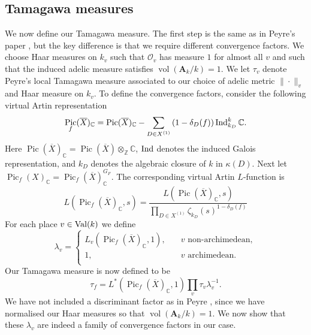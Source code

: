 \documentclass[a4paper,12pt,reqno]{amsart}
\numberwithin{equation}{section} \numberwithin{figure}{section}
\DeclareMathOperator{\Pic}{Pic} \DeclareMathOperator{\Div}{Div}
\DeclareMathOperator{\vol}{vol} \DeclareMathOperator{\spn}{span}
\renewcommand{\O}{\mathcal{O}}
\newcommand{\Adele}{\mathbf{A}}
\newcommand\ZZ{\mathbb{Z}}
\newcommand\CC{\mathbb{C}}
\renewcommand{\#}{\sharp}
\theoremstyle{definition}
\numberwithin{lemma}{section}
\begin{document}
\subsection{Tamagawa measures}
We now define our Tamagawa measure. The first step is the same as in Peyre's paper \cite[\S 2.2]{Pey95}, but the key difference is that we require different convergence factors. We choose Haar measures on $k_v$ such that $\O_v$ has measure $1$ for almost all $v$ and such that the induced adelic measure satisfies $\vol(\Adele_k/k) = 1$.
We let $\tau_v$ denote Peyre's local Tamagawa measure associated to our choice of adelic metric $\| \cdot \|_v$ and Haar measure on $k_v$. To define the convergence factors, consider the following virtual Artin representation
\begin{equation}\label{def:Pic_br}
	\Pic_f(\overline{X})_\CC=\Pic(\overline{X})_\CC
	- \sum_{D \in X^{(1)}}\left(1-\delta_D(f) \right)\Ind_{k_D}^k \CC.
\end{equation}
Here $\Pic(\overline{X})_\CC = \Pic(\overline{X}) \otimes_\ZZ \CC$, $\operatorname{Ind}$ denotes the induced
Galois representation, and $k_D$ denotes the algebraic closure of $k$ in $\kappa(D)$. 
Next let $\Pic_f(X)_\CC= \Pic_f(\overline{X})^{G_F}_\CC$.
The corresponding virtual Artin $L$-function is
\begin{equation} \label{eqn:L-function}
	L(\Pic_f(\overline{X})_\CC,s)= 
	\frac{L(\Pic(\overline{X})_{\CC},s)}{\prod_{D \in X^{(1)}} \zeta_{k_D}(s)^{1-\delta_D(f)}}
\end{equation}
For each place $v \in \operatorname{Val}(k)$ we define
$$ \lambda_v = \left \{
	\begin{array}{ll}
		L_v(\Pic_f(\overline{X})_\CC,1),& \quad v \text{ non-archimedean}, \\
		1,& \quad v \text{ archimedean}. \\
	\end{array}\right.$$	
Our Tamagawa measure is now defined to be
\begin{equation} \label{def:Tamagawa}
	\tau_f = L^*(\Pic_f(\overline{X})_\CC,1)\prod_v \tau_v \lambda_v^{-1}.
\end{equation}
We have not included a discriminant factor as in Peyre \cite[Def.~2.1]{Pey95}, since we have normalised our Haar measures so that $\vol(\Adele_k/k) = 1$. 
We now show that these $\lambda_v$ are indeed a family of convergence factors in our case.
\end{document}
